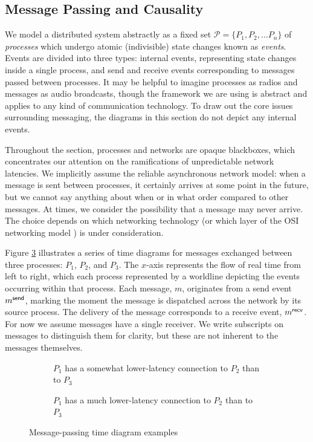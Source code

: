 \documentclass[]             %
{NASA}                       %
\theoremstyle{definition}
\begin{document}
\subsection{Message Passing and Causality}
\label{ssec:message-passing}
We model a distributed system abstractly as a fixed set
$\mathcal{P} = \{P_1, P_2, \ldots P_n\}$ of \emph{processes} which
undergo atomic (indivisible) state changes known as
\emph{events}. Events are divided into three types: internal events,
representing state changes inside a single process, and send and
receive events corresponding to messages passed between processes. It
may be helpful to imagine processes as radios and messages as audio
broadcasts, though the framework we are using is abstract and applies
to any kind of communication technology. To draw out the core issues
surrounding messaging, the diagrams in this section do not depict any
internal events.

Throughout the section, processes and networks are opaque blackboxes,
which concentrates our attention on the ramifications of unpredictable
network latencies. We implicitly assume the reliable asynchronous
network model: when a message is sent between processes, it certainly
arrives at some point in the future, but we cannot say anything about
when or in what order compared to other messages. At times, we
consider the possibility that a message may never arrive. The choice
depends on which networking technology (or which layer of the OSI
networking model \citationneeded) is under consideration.

Figure \ref{fig:message-latencies} illustrates a series of time
diagrams for messages exchanged between three processes: $P_1$, $P_2$,
and $P_3$. The $x$-axis represents the flow of real time from left to
right, which each process represented by a worldline depicting the
events occurring within that process. Each message, $m$, originates
from a send event $m_{}^{\mathsf{send}}$, marking the moment the message is
dispatched across the network by its source process. The delivery of
the message corresponds to a receive event, $m_{}^{\mathsf{recv}}$. For now we
assume messages have a single receiver. We write subscripts on
messages to distinguish them for clarity, but these are not inherent
to the messages themselves.

\begin{figure}[p]
  \setlength\belowcaptionskip{5ex}
  \begin{subfigure}{1\textwidth}
    \centering
    
    \caption{$P_1$ has a somewhat lower-latency connection to $P_2$ than to $P_3$}
    \label{fig:message-latencies-a}
  \end{subfigure}
  \begin{subfigure}{1\textwidth}
    \centering 
    \caption{$P_1$ has a much lower-latency connection to $P_2$ than to $P_3$}
    \label{fig:message-latencies-b}
  \end{subfigure}
  \caption{Message-passing time diagram examples}
  \label{fig:message-latencies}
\end{figure}
\end{document}
